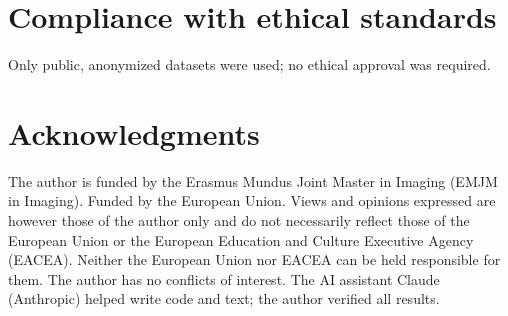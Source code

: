 \documentclass{article}
\begin{document}
\section{Compliance with ethical standards}
Only public, anonymized datasets were used; no ethical approval was required.

\section{Acknowledgments}
The author is funded by the Erasmus Mundus Joint Master in Imaging (EMJM in Imaging). Funded by the European Union. Views and opinions expressed are however those of the author only and do not necessarily reflect those of the European Union or the European Education and Culture Executive Agency (EACEA). Neither the European Union nor EACEA can be held responsible for them. The author has no conflicts of interest. The AI assistant Claude (Anthropic) helped write code and text; the author verified all results.



\end{document}
